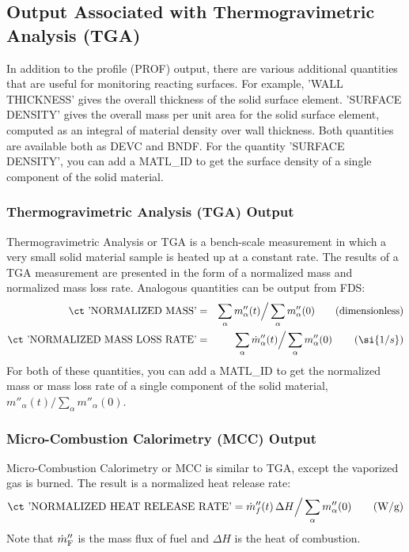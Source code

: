 \documentclass[11pt]{book}
\begin{document}
\subsection{Output Associated with Thermogravimetric Analysis (TGA)}
\label{info:material_components}

In addition to the profile ({\ct PROF}) output, there are various additional quantities that are useful for monitoring reacting surfaces. For example, {\ct 'WALL THICKNESS'} gives the overall thickness of the solid surface element. {\ct 'SURFACE DENSITY'} gives the overall mass per unit area for the solid surface element, computed as an integral of material density over wall thickness. Both quantities are available both as {\ct DEVC} and {\ct BNDF}. For the quantity {\ct 'SURFACE DENSITY'}, you can add a {\ct MATL\_ID} to get the surface density of a single component of the solid material.

\subsubsection{Thermogravimetric Analysis (TGA) Output}

Thermogravimetric Analysis or TGA is a bench-scale measurement in which a very small solid material sample is heated up at a constant rate. The results of a TGA measurement are presented in the form of a normalized mass and normalized mass loss rate. Analogous quantities can be output from FDS:
\begin{eqnarray*}
   \hbox{\ct 'NORMALIZED MASS'} &=& \sum_\alpha  m''_\alpha (t) \Big/ \sum_\alpha  m''_\alpha (0) \quad \quad \hbox{(dimensionless)} \\
   \hbox{\ct 'NORMALIZED MASS LOSS RATE'} &=& \sum_\alpha  \dot{m}''_\alpha (t) \Big/ \sum_\alpha  m''_\alpha (0)  \quad \quad \left( \si{1/s} \right)
\end{eqnarray*}
For both of these quantities, you can add a {\ct MATL\_ID} to get the normalized mass or mass loss rate of a single component of the solid material, $m''_\alpha (t) / \sum_\alpha  m''_\alpha (0)$.

\subsubsection{Micro-Combustion Calorimetry (MCC) Output}

Micro-Combustion Calorimetry or MCC is similar to TGA, except the vaporized gas is burned. The result is a normalized heat release rate:
\begin{equation*}
   \hbox{\ct 'NORMALIZED HEAT RELEASE RATE'} =  \dot{m}''_f (t) \, \Delta H \Big/ \sum_\alpha  m''_\alpha (0) \quad \quad \hbox{(W/g)}
\end{equation*}
Note that $\dot{m}''_{\rm F}$ is the mass flux of fuel and $\Delta H$ is the heat of combustion.
\end{document}
